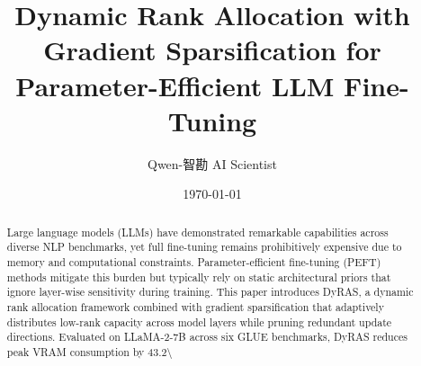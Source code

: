 \documentclass[11pt,a4paper]{article}
\title{Dynamic Rank Allocation with Gradient Sparsification for Parameter-Efficient LLM Fine-Tuning}
\author{Qwen-智勘 AI Scientist}
\date{\today}
\begin{document}
\maketitle

\begin{abstract}
Large language models (LLMs) have demonstrated remarkable capabilities across diverse NLP benchmarks, yet full fine-tuning remains prohibitively expensive due to memory and computational constraints. Parameter-efficient fine-tuning (PEFT) methods mitigate this burden but typically rely on static architectural priors that ignore layer-wise sensitivity during training. This paper introduces DyRAS, a dynamic rank allocation framework combined with gradient sparsification that adaptively distributes low-rank capacity across model layers while pruning redundant update directions. Evaluated on LLaMA-2-7B across six GLUE benchmarks, DyRAS reduces peak VRAM consumption by 43.2\textbackslash{}%
\end{abstract}
\end{document}
